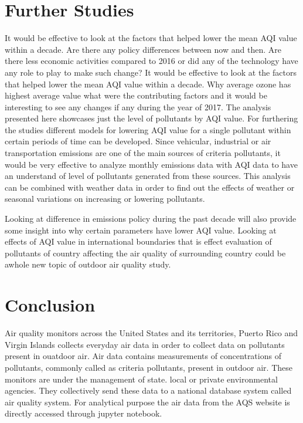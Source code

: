 \documentclass[sigconf]{acmart}
\begin{document}
\section{Further Studies}
   It would be effective to look at the factors that helped lower the mean AQI value within a decade. Are there any policy differences between now and then. Are there less economic activities compared to 2016 or did any of the technology have any role to play to make such change? It would be effective to look at the factors that helped lower the mean AQI value within a decade. Why average ozone has highest average value what were the contributing factors and it would be interesting to see any changes if any during the year of 2017.
   The analysis presented here showcases just the level of pollutants by AQI value. For furthering the studies different models for lowering AQI value for a single pollutant within certain periods of time can be developed. Since vehicular, industrial or air transportation emissions are one of the main sources of criteria pollutants, it would be very effective to analyze monthly emissions data with AQI data to have an understand of level of pollutants generated from these sources.  
   This analysis can be combined with weather data in order to find out the effects of weather or seasonal variations on increasing or lowering pollutants. 

   Looking at difference in emissions policy during the past decade will also provide some insight into why certain parameters have lower AQI value. Looking at effects of AQI value in international boundaries that is effect evaluation of pollutants of country affecting the air quality of surrounding country could be awhole new topic of outdoor air quality study.



\section{Conclusion}
   
   Air quality monitors across the United States and its territories, Puerto Rico and Virgin Islands collects everyday air data in order to collect data on pollutants present in ouatdoor air. Air data contains measurements of concentrations of pollutants, commonly called as criteria pollutants, present in outdoor air. These monitors are under the management of state. local or private environmental agencies. They collectively send these data to a national database system called air quality system. For analytical purpose the air data from the AQS website is directly accessed through jupyter notebook.
   
\end{document}
